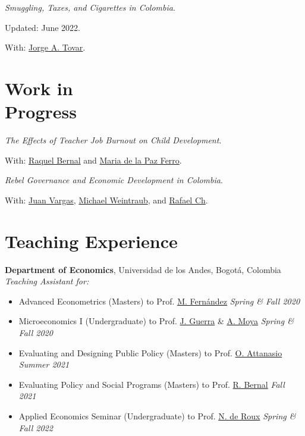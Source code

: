 \documentclass[margin,line]{res}
\newenvironment{list1}{
  \begin{list}{\ding{113}}{%
      \setlength{\itemsep}{0in}
      \setlength{\parsep}{0in} \setlength{\parskip}{0in}
      \setlength{\topsep}{0in} \setlength{\partopsep}{0in} 
      \setlength{\leftmargin}{0.17in}}}{\end{list}}
\begin{document}
\begin{resume}
\textit{Smuggling, Taxes, and Cigarettes in Colombia}.
\begin{list1}
    \item[] Updated: June 2022. %
    \item[] With: \href{https://sites.google.com/view/jorgetovar/home}{Jorge A. Tovar}.
\end{list1}

\section{\sc Work in \\ Progress}

\textit{The Effects of Teacher Job Burnout on Child Development}.
\begin{list1}
    \item[] With: \href{https://sites.google.com/view/raquelbernal}{Raquel Bernal} and \href{https://economics.ucsd.edu/graduate-program/about/grad-profiles/cohort%202021/Ferro-maria.html}{Maria de la Paz Ferro}.  
\end{list1}

\textit{Rebel Governance and Economic Development in Colombia}.
\begin{list1}
    \item[] With: \href{https://sites.google.com/site/juanfvargas/}{Juan Vargas},  \href{http://www.miweintraub.com/}{Michael Weintraub}, and  \href{https://wp.nyu.edu/rafaelch/}{Rafael Ch}.  
\end{list1}

\section{\sc Teaching Experience}

{\bf Department of Economics}, Universidad de los Andes, Bogotá, Colombia \\
{\em Teaching Assistant for:} \\
\vspace{-.3cm}
\begin{itemize}
    \item Advanced Econometrics (Masters) to Prof. \href{https://sites.google.com/view/manuelfernandezsierra}{M. Fernández} \hfill \emph{Spring  \& Fall 2020}
    \item Microeconomics I (Undergraduate) to Prof. \href{https://jguerraforero.wixsite.com/joseaguerra}{J. Guerra} \& \href{https://sites.google.com/view/andresmoya}{A. Moya} \hfill \emph{Spring \& Fall 2020}
    \item Evaluating and Designing Public Policy (Masters) to Prof. \href{http://www.orazioattanasio.org/}{O. Attanasio}  \hfill \emph{Summer 2021}
    \item Evaluating Policy and Social Programs (Masters) to Prof. \href{https://sites.google.com/view/raquelbernal}{R. Bernal}  \hfill \emph{Fall 2021}
    \item Applied Economics Seminar (Undergraduate) to Prof. \href{https://sites.google.com/site/nicoderoux/}{N. de Roux}  \hfill \emph{Spring \& Fall 2022}
\end{itemize}




\end{resume}
\end{document}
